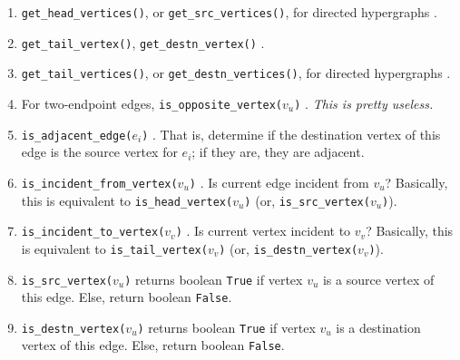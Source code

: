 \begin{enumerate}
\begin{enumerate}
	\item {\tt get\_head\_vertices()}, or {\tt get\_src\_vertices()}, for directed hypergraphs \cite[\S13.1.1, pp. 599]{Goodrich2011}.
	\item {\tt get\_tail\_vertex()}, {\tt get\_destn\_vertex()} \cite[\S13.1.1, pp. 599]{Goodrich2011}.
	\item {\tt get\_tail\_vertices()}, or {\tt get\_destn\_vertices()}, for directed hypergraphs \cite[\S13.1.1, pp. 599]{Goodrich2011}.
	\item For two-endpoint edges, {\tt is\_opposite\_vertex($v_{u}$)} \cite[\S13.1.1, pp. 599]{Goodrich2011}. {\it This is pretty useless.}
	\item {\tt is\_adjacent\_edge($e_{i}$)} \cite[\S13.1.1, pp. 599]{Goodrich2011}. That is, determine if the destination vertex of this edge is the source vertex for $e_{i}$; if they are, they are adjacent.
	\item {\tt is\_incident\_from\_vertex($v_{u}$)} \cite[\S13.1.1, pp. 599]{Goodrich2011}. Is current edge incident from $v_{u}$? Basically, this is equivalent to {\tt is\_head\_vertex($v_{u}$)} (or, {\tt is\_src\_vertex($v_{u}$)}).
	\item {\tt is\_incident\_to\_vertex($v_{v}$)} \cite[\S13.1.1, pp. 599]{Goodrich2011}. Is current vertex incident to $v_{v}$? Basically, this is equivalent to {\tt is\_tail\_vertex($v_{v}$)} (or, {\tt is\_destn\_vertex($v_{v}$)}).
	\item {\tt is\_src\_vertex($v_{u}$)} returns boolean {\tt True} if vertex $v_{u}$ is a source vertex of this edge. Else, return boolean {\tt False}.
	\item {\tt is\_destn\_vertex($v_{u}$)} returns boolean {\tt True} if vertex $v_{u}$ is a destination vertex of this edge. Else, return boolean {\tt False}.
	\end{enumerate}
\end{enumerate}



